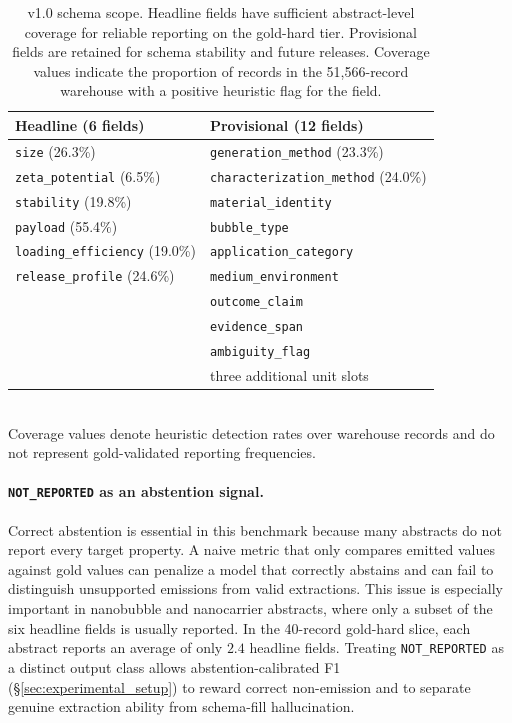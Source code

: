 \documentclass{article}
\newcommand{\NR}{\texttt{NOT\_REPORTED}}
\begin{document}
\begin{table}[t]
\centering
\caption{v1.0 schema scope. Headline fields have sufficient abstract-level coverage for reliable reporting on the gold-hard tier. Provisional fields are retained for schema stability and future releases. Coverage values indicate the proportion of records in the 51{,}566-record warehouse with a positive heuristic flag for the field.}
\label{tab:schema_scope}
\small
\setlength{\tabcolsep}{6pt}
\begin{tabular}{@{}p{}p{}@{}}
\toprule
\textbf{Headline (6 fields)} & \textbf{Provisional (12 fields)} \\
\midrule
\texttt{size} (26.3\%)              & \texttt{generation\_method} (23.3\%) \\
\texttt{zeta\_potential} (6.5\%)    & \texttt{characterization\_method} (24.0\%) \\
\texttt{stability} (19.8\%)         & \texttt{material\_identity} \\
\texttt{payload} (55.4\%)           & \texttt{bubble\_type} \\
\texttt{loading\_efficiency} (19.0\%) & \texttt{application\_category} \\
\texttt{release\_profile} (24.6\%)  & \texttt{medium\_environment} \\
                                    & \texttt{outcome\_claim} \\
                                    & \texttt{evidence\_span} \\
                                    & \texttt{ambiguity\_flag} \\
                                    & three additional unit slots \\
\bottomrule
\end{tabular}
\\[2pt]
{\footnotesize Coverage values denote heuristic detection rates over warehouse records and do not represent gold-validated reporting frequencies.}
\end{table}

\paragraph{\NR{} as an abstention signal.}
Correct abstention is essential in this benchmark because many abstracts do not report every target property. A naive metric that only compares emitted values against gold values can penalize a model that correctly abstains and can fail to distinguish unsupported emissions from valid extractions. This issue is especially important in nanobubble and nanocarrier abstracts, where only a subset of the six headline fields is usually reported. In the 40-record gold-hard slice, each abstract reports an average of only $2.4$ headline fields. Treating \NR{} as a distinct output class allows abstention-calibrated F1 (\S\ref{sec:experimental_setup}) to reward correct non-emission and to separate genuine extraction ability from schema-fill hallucination.
\end{document}
